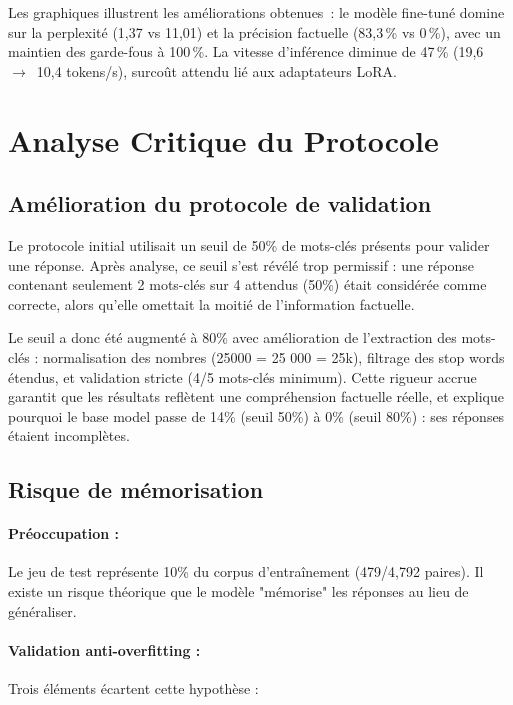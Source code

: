 Les graphiques illustrent les améliorations obtenues~: le modèle fine-tuné domine sur la perplexité (1,37 vs 11,01) et la précision factuelle (83,3\,\% vs 0\,\%), avec un maintien des garde-fous à 100\,\%. La vitesse d'inférence diminue de 47\,\% (19,6~$\rightarrow$~10,4 tokens/s), surcoût attendu lié aux adaptateurs LoRA.

\section{Analyse Critique du Protocole}

\subsection{Amélioration du protocole de validation}

Le protocole initial utilisait un seuil de 50\% de mots-clés présents pour valider une réponse. Après analyse, ce seuil s'est révélé trop permissif : une réponse contenant seulement 2 mots-clés sur 4 attendus (50\%) était considérée comme correcte, alors qu'elle omettait la moitié de l'information factuelle.

Le seuil a donc été augmenté à 80\% avec amélioration de l'extraction des mots-clés : normalisation des nombres (25000 = 25 000 = 25k), filtrage des stop words étendus, et validation stricte (4/5 mots-clés minimum). Cette rigueur accrue garantit que les résultats reflètent une compréhension factuelle réelle, et explique pourquoi le base model passe de 14\% (seuil 50\%) à 0\% (seuil 80\%) : ses réponses étaient incomplètes.

\subsection{Risque de mémorisation}
\label{sec:anti_memorisation}

\paragraph{Préoccupation :}
Le jeu de test représente 10\% du corpus d'entraînement (479/4,792 paires). Il existe un risque théorique que le modèle "mémorise" les réponses au lieu de généraliser.

\paragraph{Validation anti-overfitting :}
Trois éléments écartent cette hypothèse :


